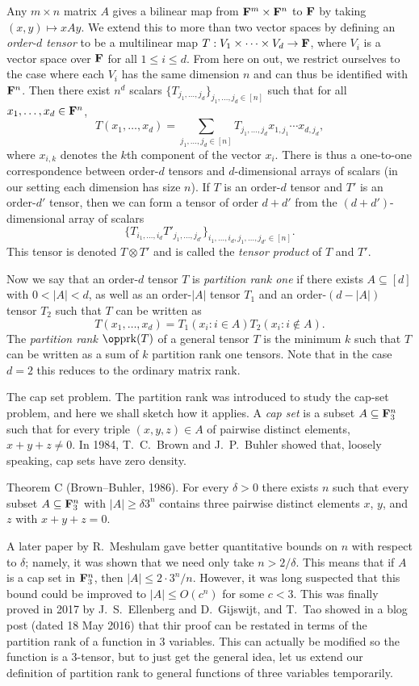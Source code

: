 Any $m\times n$ matrix $A$ gives a bilinear map from ${\bf F}^m \times {\bf F}^n$ to ${\bf F}$ by taking
$(x,y)\mapsto xAy$. We extend this to more than two vector spaces by defining an {\it order-$d$ tensor}
to be a multilinear map $T : V_1\times\cdots\times V_d\to {\bf F}$, where $V_i$ is a vector space over ${\bf F}$
for all $1\le i\le d$. From here on out,
we restrict ourselves to the case where each $V_i$ has the same dimension $n$ and can thus be identified
with ${\bf F}^n$. Then there exist $n^d$ scalars $\{T_{j_1,\ldots,j_d}\}_{j_1,\ldots,j_d\in [n]}$
such that for all $x_1,\ldots,x_d\in {\bf F}^n$,
$$ T(x_1, \ldots, x_d) = \sum_{j_1,\ldots,j_d\in [n]} T_{j_1,\ldots,j_d} x_{1,j_1}\cdots x_{d,j_d},$$
where $x_{i, k}$ denotes the $k$th component of the vector $x_i$. There is thus a one-to-one correspondence
between order-$d$ tensors and $d$-dimensional arrays of scalars (in our setting each dimension has size
$n$).
If $T$ is an order-$d$ tensor and $T'$ is an order-$d'$ tensor, then we can form a tensor of order $d+d'$
from the $(d+d')$-dimensional array of scalars
$$\{T_{i_1,\ldots,i_d}T'_{j_1,\ldots,j_{d'}}\}_{i_1,\ldots,i_{d},j_1,\ldots,j_{d'}\in [n]}.$$
This tensor is denoted $T\otimes T'$ and is called the {\it tensor product} of $T$ and $T'$.

Now we say that an order-$d$ tensor $T$ is {\it partition rank one} if there exists $A\subseteq [d]$
with $0 < |A| < d$, as well as an order-$|A|$ tensor $T_1$ and an order-$(d-|A|)$ tensor $T_2$ such
that $T$ can be written as
$$ T(x_1, \ldots, x_d) = T_1(x_i : i\in A)T_2(x_i : i\notin A).$$
The {\it partition rank} $\prk(T)$ of a
general tensor $T$ is the minimum $k$ such that $T$ can be written as a sum
of $k$ partition rank one tensors. Note that in the case $d=2$ this reduces to the ordinary matrix rank.

\medskip\boldlabel The cap set problem. The partition rank was introduced to study the cap-set problem,
and here we shall sketch how it applies. A {\it cap set} is a subset $A\subseteq {\bf F}_3^n$ such that for
every triple $(x,y,z)\in A$ of pairwise distinct elements, $x+y+z\ne 0$. In 1984, T.~C.~Brown
and J.~P.~Buhler showed that, loosely speaking, cap sets have zero density.

\parenproclaim Theorem C (Brown--Buhler{\rm, 1986}). For every $\delta>0$
there exists $n$ such that every subset $A\subseteq {\bf F}_3^n$ with $|A|\ge \delta 3^n$ contains three pairwise
distinct elements $x$, $y$, and $z$ with $x+y+z=0$.

A later paper by R.~Meshulam gave better quantitative
bounds on $n$ with respect to $\delta$; namely, it was shown that we need only take $n > 2/\delta$.
This means that if $A$ is a cap set in ${\bf F}_3^n$, then $|A| \le 2\cdot 3^n/n$. However, it was long
suspected that this bound could be improved to $|A| \le O(c^n)$ for some $c<3$. This was finally proved
in 2017 by J.~S.~Ellenberg and D.~Gijswijt, and T.~Tao showed in a blog post (dated 18 May 2016)
that thir proof can be restated in terms of the partition rank of a function in $3$ variables. This
can actually be modified so the function is a $3$-tensor, but to just get the general idea, let
us extend our definition of partition rank to general functions of three variables temporarily.

